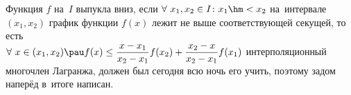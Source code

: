 
    Функция $f$ на~$I$ выпукла вниз, если $\forall\  x_1,x_2\in I\colon x_1\hm<x_2$ на~интервале $(x_1,x_2)$ график функции $f(x)$ лежит не выше
    соответствующей секущей, то есть \\$\forall\  x\in (x_1,x_2)\pau f(x)\leq\dfrac{x-x_1}{x_2-x_1}f(x_2)+\dfrac{x_2-x}{x_2-x_1}f(x_1)$ интерполяционный многочлен
    Лагранжа, должен был сегодня всю ночь его учить, поэтому задом наперёд в~итоге написан.

